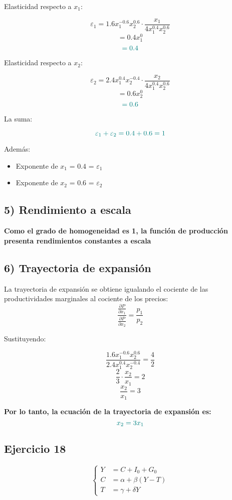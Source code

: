 \documentclass{article}
\begin{document}
Elasticidad respecto a \(x_1\):

\[
\varepsilon_1 = 1.6x_1^{-0.6}x_2^{0.6} \cdot \frac{x_1}{4x_1^{0.4}x_2^{0.6}}
\]
\[
= 0.4x_1^{0}
\]
\[
\color{teal}
= 0.4
\]

Elasticidad respecto a \(x_2\):

\[
\varepsilon_2 = 2.4x_1^{0.4}x_2^{-0.4} \cdot \frac{x_2}{4x_1^{0.4}x_2^{0.6}}
\]
\[
= 0.6x_2^{0}
\]
\[
\color{teal}
= 0.6
\]

La suma:

\[
\color{teal}
\varepsilon_1 + \varepsilon_2 = 0.4 + 0.6 = 1
\]

Además:

\begin{itemize}
  \item \color{teal} Exponente de \(x_1\) = \(0.4\) = \(\varepsilon_1\)
  \item \color{teal} Exponente de \(x_2\) = \(0.6\) = \(\varepsilon_2\)
\end{itemize}

\subsection*{5) Rendimiento a escala}

\textbf{\color{teal}Como el grado de homogeneidad es 1, la función de producción presenta rendimientos constantes a escala}

\subsection*{6) Trayectoria de expansión}

La trayectoria de expansión se obtiene igualando el cociente de las productividades marginales al cociente de los precios:
\[
\frac{\frac{\partial P}{\partial x_1}}{\frac{\partial P}{\partial x_2}} = \frac{p_1}{p_2}
\]

Sustituyendo:

\[
\frac{1.6x_1^{-0.6}x_2^{0.6}}{2.4x_1^{0.4}x_2^{-0.4}} = \frac{4}{2}
\]
\[
\frac{2}{3} \cdot \frac{x_2}{x_1} = 2
\]
\[
\frac{x_2}{x_1} = 3
\]

\textbf{\color{teal}Por lo tanto, la ecuación de la trayectoria de expansión es:}
\[
\color{teal}
x_2 = 3x_1
\]
\newpage
\subsection{Ejercicio 18}


\begin{equation*}
\left\{
\begin{aligned}
Y &= C + I_0 + G_0 \\
C &= \alpha + \beta (Y - T) \\
T &= \gamma + \delta Y
\end{aligned}
\right.
\end{equation*}
\end{document}
